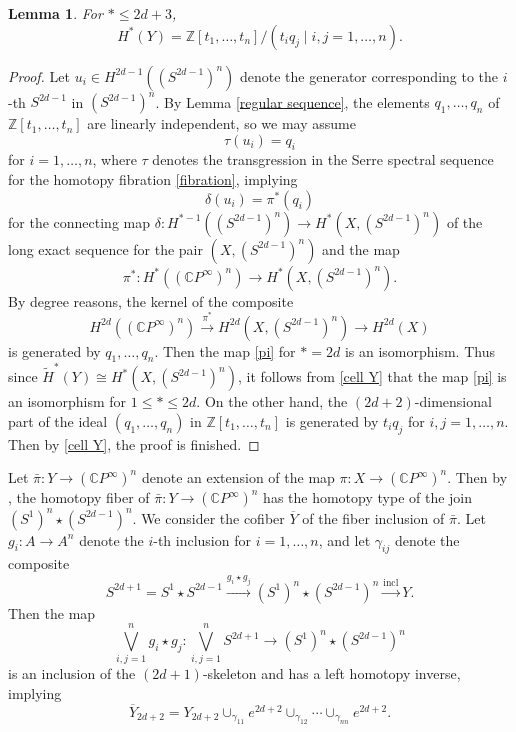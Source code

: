 \documentclass[a4paper]{amsart}
\numberwithin{equation}{section}
\newtheorem{lemma}[theorem]{Lemma}
\theoremstyle{definition}
\theoremstyle{remark}
\numberwithin{equation}{section}
\newcommand{\Z}{\mathbb{Z}}
\newcommand{\C}{\mathbb{C}}
\begin{document}
\begin{lemma}
  \label{Y}
  For $*\le 2d+3$,
  \[
    H^*(Y)=\Z[t_1,\ldots,t_n]/(t_iq_j\mid i,j=1,\ldots,n).
  \]
\end{lemma}

\begin{proof}
  Let $u_i\in H^{2d-1}((S^{2d-1})^n)$ denote the generator corresponding to the $i$-th $S^{2d-1}$ in $(S^{2d-1})^n$. By Lemma \ref{regular sequence}, the elements $q_1,\ldots,q_n$ of $\Z[t_1,\ldots,t_n]$ are linearly independent, so we may assume
  \[
    \tau(u_i)=q_i
  \]
  for $i=1,\ldots,n$, where $\tau$ denotes the transgression in the Serre spectral sequence for the homotopy fibration \eqref{fibration}, implying
  \[
    \delta(u_i)=\pi^*(q_i)
  \]
  for the connecting map $\delta\colon H^{*-1}((S^{2d-1})^n)\to H^*(X,(S^{2d-1})^n)$ of the long exact sequence for the pair $(X,(S^{2d-1})^n)$ and the map
  \begin{equation}
    \label{pi}
    \pi^*\colon H^*((\C P^\infty)^n)\to H^*(X,(S^{2d-1})^n).
  \end{equation}
  By degree reasons, the kernel of the composite
  \[
    H^{2d}((\C P^\infty)^n)\xrightarrow{\pi^*}H^{2d}(X,(S^{2d-1})^n)\to H^{2d}(X)
  \]
  is generated by $q_1,\ldots,q_n$. Then the map \eqref{pi} for $*=2d$ is an isomorphism. Thus since $\widetilde{H}^*(Y)\cong H^*(X,(S^{2d-1})^n)$, it follows from \eqref{cell Y} that the map \eqref{pi} is an isomorphism for $1\le *\le 2d$. On the other hand, the $(2d+2)$-dimensional part of the ideal $(q_1,\ldots,q_n)$ in $\Z[t_1,\ldots,t_n]$ is generated by $t_iq_j$ for $i,j=1,\ldots,n$. Then by \eqref{cell Y}, the proof is finished.
\end{proof}



Let $\bar{\pi}\colon Y\to(\C P^\infty)^n$ denote an extension of the map $\pi\colon X\to(\C P^\infty)^n$. Then by \cite[Theorem 1.1]{G0}, the homotopy fiber of $\bar{\pi}\colon Y\to(\C P^\infty)^n$ has the homotopy type of the join $(S^1)^n\star(S^{2d-1})^n$. We consider the cofiber $\overline{Y}$ of the fiber inclusion of $\bar{\pi}$. Let $g_i\colon A\to A^n$ denote the $i$-th inclusion for $i=1,\ldots,n$, and let $\gamma_{ij}$ denote the composite
\[
  S^{2d+1}=S^1\star S^{2d-1}\xrightarrow{g_i\star g_j}(S^1)^n\star(S^{2d-1})^n\xrightarrow{\text{incl}}Y.
\]
Then the map
\[
  \bigvee_{i,j=1}^ng_i\star g_j\colon\bigvee_{i,j=1}^nS^{2d+1}\to (S^1)^n\star(S^{2d-1})^n
\]
is an inclusion of the $(2d+1)$-skeleton and has a left homotopy inverse, implying
\begin{equation}
  \label{cell barY}
  \overline{Y}_{2d+2}=Y_{2d+2}\cup_{\gamma_{11}}e^{2d+2}\cup_{\gamma_{12}}\cdots\cup_{\gamma_{nn}}e^{2d+2}.
\end{equation}
\end{document}
